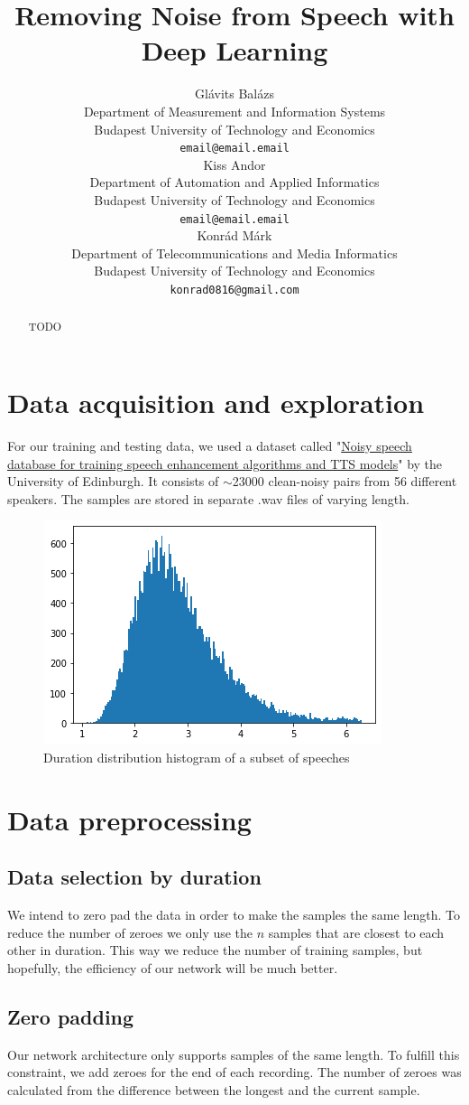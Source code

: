 \documentclass{article}
\title{Removing Noise from Speech with Deep Learning}
\author{
	Glávits Balázs \\
	Department of Measurement and Information Systems\\
	Budapest University of Technology and Economics\\
	\texttt{email@email.email} \\
	 \And
	Kiss Andor \\
	Department of Automation and Applied Informatics\\
	Budapest University of Technology and Economics\\
	\texttt{email@email.email} \\	 
	 \And
	Konrád Márk \\
	Department of Telecommunications and Media Informatics\\
	Budapest University of Technology and Economics\\
	\texttt{konrad0816@gmail.com} \\
}
\begin{document}
	
	\maketitle
	
	\begin{abstract}
		TODO
	\end{abstract}
	\newpage
	\section{Data acquisition and exploration}
	For our training and testing data, we used a dataset called "\href{https://datashare.is.ed.ac.uk/handle/10283/2791}{Noisy speech database for training speech enhancement algorithms and TTS models}" by the University of Edinburgh. It consists of $\sim$23000 clean-noisy pairs from 56 different speakers. 
	The samples are stored in separate .wav files of varying length.  

	\begin{figure}[H]
		\centering
		\includegraphics[width=.5\linewidth]{durations}
		\caption{Duration distribution histogram of a subset of speeches}
	\end{figure}

	

	\section{Data preprocessing}
	\subsection{Data selection by duration}
	We intend to zero pad the data in order to make the samples the same length. To reduce the number of zeroes we only use the $n$ samples that are closest to each other in duration. This way we reduce the number of training samples, but hopefully, the efficiency of our network will be much better.
	
	\subsection{Zero padding}
	Our network architecture only supports samples of the same length. To fulfill this constraint, we add zeroes for the end of each recording. The number of zeroes was calculated from the difference between the longest and the current sample.
	
\end{document}
